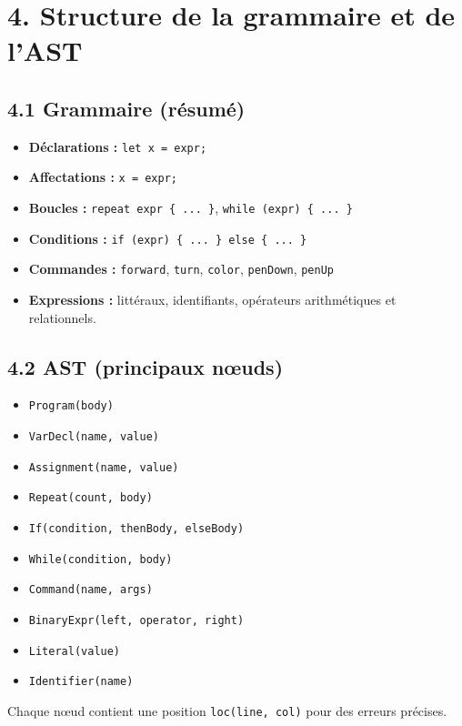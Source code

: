 \documentclass[11pt,a4paper]{article}
\begin{document}
\section*{4. Structure de la grammaire et de l’AST}

\subsection*{4.1 Grammaire (résumé)}
\begin{itemize}[leftmargin=1.2cm]
  \item \textbf{Déclarations :} \texttt{let x = expr;}
  \item \textbf{Affectations :} \texttt{x = expr;}
  \item \textbf{Boucles :} \texttt{repeat expr \{ ... \}}, \texttt{while (expr) \{ ... \}}
  \item \textbf{Conditions :} \texttt{if (expr) \{ ... \} else \{ ... \}}
  \item \textbf{Commandes :} \texttt{forward}, \texttt{turn}, \texttt{color}, \texttt{penDown}, \texttt{penUp}
  \item \textbf{Expressions :} littéraux, identifiants, opérateurs arithmétiques et relationnels.
\end{itemize}

\subsection*{4.2 AST (principaux nœuds)}
\begin{itemize}[leftmargin=1.2cm]
  \item \texttt{Program(body)}
  \item \texttt{VarDecl(name, value)}
  \item \texttt{Assignment(name, value)}
  \item \texttt{Repeat(count, body)}
  \item \texttt{If(condition, thenBody, elseBody)}
  \item \texttt{While(condition, body)}
  \item \texttt{Command(name, args)}
  \item \texttt{BinaryExpr(left, operator, right)}
  \item \texttt{Literal(value)}
  \item \texttt{Identifier(name)}
\end{itemize}

Chaque nœud contient une position \texttt{loc(line, col)} pour des erreurs précises.
\end{document}
